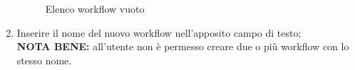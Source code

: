 \begin{enumerate}
	\begin{figure}[!ht]
		\centering
		\caption{Elenco workflow vuoto}
	\end{figure}
	\newpage
\item Inserire il nome del nuovo workflow nell'apposito campo di testo;\\
\textbf{NOTA BENE:} all'utente non è permesso creare due o più workflow con lo stesso nome.


\end{enumerate}
